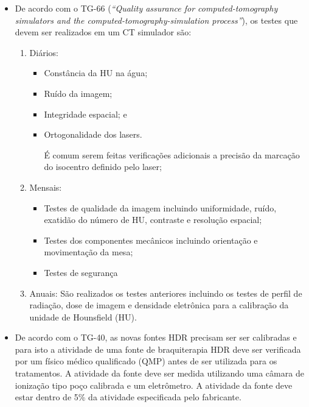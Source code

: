\documentclass[11pt,a4paper]{article}
\newcounter{exemplo}
\begin{document}
\begin{exemplo}[11. Qualidade ]
\begin{itemize}
        \item De acordo com o TG-66 (\textit{``Quality assurance for computed-tomography simulators and the computed-tomography-simulation process''}), os testes que devem ser realizados em um CT simulador são:
            \begin{enumerate}
                \item Diários:
                    \begin{itemize}[label=\textcolor{CarnationPink}{$\star$}]
                        \item Constância da HU na água;
                        \item Ruído da imagem;
                        \item Integridade espacial; e
                        \item Ortogonalidade dos lasers.
                        
                        É comum serem feitas verificações adicionais a precisão da marcação do isocentro definido pelo laser;
                    \end{itemize}

                \item Mensais:
                    \begin{itemize}[label=\textcolor{CarnationPink}{$\star$}]
                        \item Testes de qualidade da imagem incluindo uniformidade, ruído, exatidão do número de HU, contraste e resolução espacial;
                        \item Testes dos componentes mecânicos incluindo orientação e movimentação da mesa;
                        \item Testes de segurança
                    \end{itemize}

                \item Anuais: São realizados os testes anteriores incluindo os testes de perfil de radiação, dose de imagem e densidade eletrônica para a calibração da unidade de Hounsfield (HU).
            \end{enumerate}

        \item De acordo com o TG-40, as novas fontes HDR precisam ser ser calibradas e para isto a atividade de uma fonte de braquiterapia HDR deve ser verificada por um físico médico qualificado (QMP) antes de ser utilizada para os tratamentos. A atividade da fonte deve ser medida utilizando uma câmara de ionização tipo poço calibrada e um eletrômetro. A atividade da fonte deve estar dentro de 5\% da atividade especificada pelo fabricante.


\end{itemize}
\end{exemplo}
\end{document}
